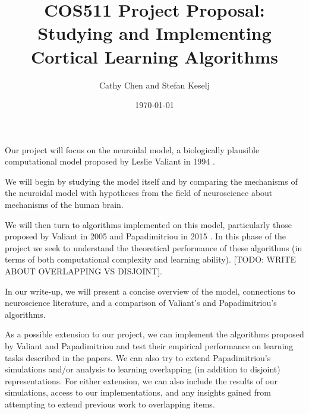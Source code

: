 \documentclass[pageno]{jpaper}
\begin{document}
\title{COS511 Project Proposal: Studying and Implementing Cortical Learning Algorithms}

\author{Cathy Chen and Stefan Keselj}
\date{\today}
\maketitle

Our project will focus on the neuroidal model, a biologically plausible computational model proposed by Leslie Valiant in 1994 \cite{valiant_circuits_1994}.

We will begin by studying the model itself and by comparing the mechanisms of the neuroidal model with hypotheses from the field of neuroscience about mechanisms of the human brain.

We will then turn to algorithms implemented on this model, particularly those proposed by Valiant in 2005 \cite{valiant_memorization_2005} and Papadimitriou in 2015 \cite{papadimitriou_cortical_2015}. In this phase of the project we seek to understand the theoretical performance of these algorithms (in terms of both computational complexity and learning ability). [TODO: WRITE ABOUT OVERLAPPING VS DISJOINT].

In our write-up, we will present a concise overview of the model, connections to neuroscience literature, and a comparison of Valiant's and Papadimitriou's algorithms. 

As a possible extension to our project, we can implement the algorithms proposed by Valiant and Papadimitriou and test their empirical performance on learning tasks described in the papers. We can also try to extend Papadimitriou's simulations and/or analysis to learning overlapping (in addition to disjoint) representations. For either extension, we can also include the results of our simulations, access to our implementations, and any insights gained from attempting to extend previous work to overlapping items.

\thispagestyle{empty}
{}


\end{document}
